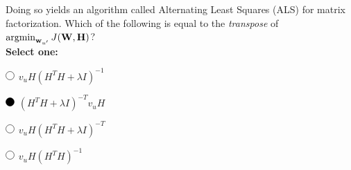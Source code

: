 \begin{enumerate}
     Doing so yields an algorithm called Alternating Least Squares (ALS) for matrix factorization. Which of the following is equal to the \emph{transpose} of $\mathop{\mathrm{argmin}}_{\mathbf{w}_{u'}} J(\mathbf{W}, \mathbf{H})$?\\
     \textbf{Select one:}

        \begin{list}{}
        \item $\circle$ $v_uH(H^TH+\lambda I)^{-1}$
        \item $\blackcircle$ $(H^TH+\lambda I)^{-T}v_uH$
        \item $\circle$ $v_uH(H^TH+\lambda I)^{-T}$
        \item $\circle$ $v_uH(H^TH)^{-1}$
    \end{list}    
    
    
    \end{enumerate}
    